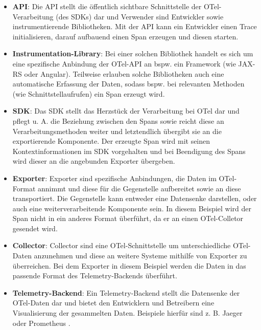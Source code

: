 \begin{itemize}
	\item \textbf{API}: Die API stellt die öffentlich sichtbare Schnittstelle der OTel-Verarbeitung (des SDKs) dar und Verwender sind Entwickler sowie instrumentierende Bibliotheken. Mit der API kann ein Entwickler einen Trace initialisieren, darauf aufbauend einen Span erzeugen und diesen starten.
	\item \textbf{Instrumentation-Library}: Bei einer solchen Bibliothek handelt es sich um eine spezifische Anbindung der OTel-API an bspw. ein Framework (wie JAX-RS oder Angular). Teilweise erlauben solche Bibliotheken auch eine automatische Erfassung der Daten, sodass bspw. bei relevanten Methoden (wie Schnittstellaufrufen) ein Span erzeugt wird.
	\item \textbf{SDK}: Das SDK stellt das Herzstück der Verarbeitung bei OTel dar und pflegt u. A. die Beziehung zwischen den Spans sowie reicht diese an Verarbeitungsmethoden weiter und letztendlich übergibt sie an die exportierende Komponente. Der erzeugte Span wird mit seinen Kontextinformationen im SDK vorgehalten und bei Beendigung des Spans wird dieser an die angebunden Exporter übergeben.
	\item \textbf{Exporter}: Exporter sind spezifische Anbindungen, die Daten im OTel-Format annimmt und diese für die Gegenstelle aufbereitet sowie an diese transportiert. Die Gegenstelle kann entweder eine Datensenke darstellen, oder auch eine weiterverarbeitende Komponente sein. In diesem Beispiel wird der Span nicht in ein anderes Format überführt, da er an einen OTel-Colletor gesendet wird.
	\item \textbf{Collector}: Collector sind eine OTel-Schnittstelle um unterschiedliche OTel-Daten anzunehmen und diese an weitere Systeme mithilfe von Exporter zu überreichen. Bei dem Exporter in diesem Beispiel werden die Daten in das passende Format des Telemetry-Backends überführt.
	\item \textbf{Telemetry-Backend}: Ein Telemetry-Backend stellt die Datensenke der OTel-Daten dar und bietet den Entwicklern und Betreibern eine Visualisierung der gesammelten Daten. Beispiele hierfür sind z. B. Jaeger \cite{Jaeger} oder Prometheus \cite{Prometheus}.
\end{itemize}
 
